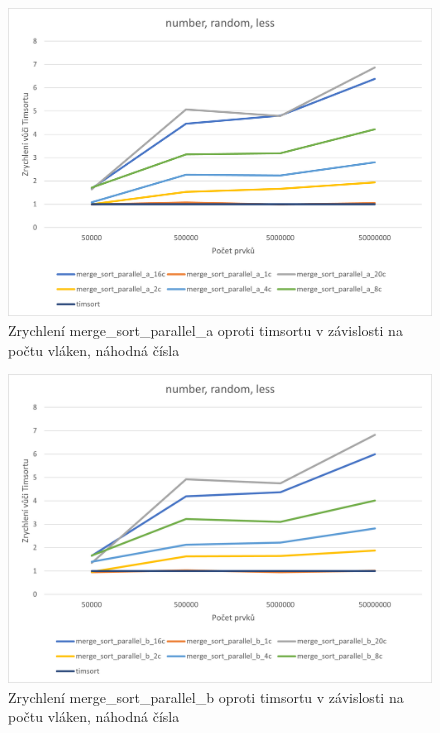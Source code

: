 \documentclass[thesis=B,czech]{FITthesis}[2019/12/23]
\begin{document}
\begin{figure}[hbp]\centering
	\includegraphics[width=13cm]{obrazky/graf20.png}
	\caption[Zrychlení merge\_sort\_parallel\_a oproti timsortu v závislosti na počtu vláken, náhodná čísla]{Zrychlení merge\_sort\_parallel\_a oproti timsortu v závislosti na počtu vláken, náhodná čísla}\label{fig:graf20}
\end{figure}

\begin{figure}[htbp]\centering
	\includegraphics[width=13cm]{obrazky/graf21.png}
	\caption[Zrychlení merge\_sort\_parallel\_b oproti timsortu v závislosti na počtu vláken, náhodná čísla]{Zrychlení merge\_sort\_parallel\_b oproti timsortu v závislosti na počtu vláken, náhodná čísla}\label{fig:graf21}
\end{figure}
\end{document}

